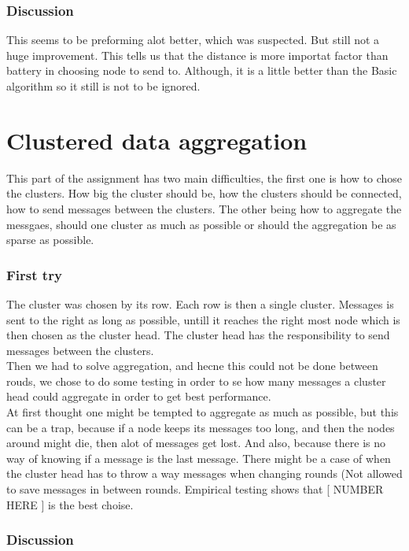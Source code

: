 \documentclass{article}
\begin{document}
    \section{Discussion}
      This seems to be preforming alot better, which was suspected. But still not a huge
      improvement. This tells us that the distance is more importat factor than battery
      in choosing node to send to. Although, it is a little better than the Basic algorithm
      so it still is not to be ignored.
\part{Clustered data aggregation}
  This part of the assignment has two main difficulties, the first one is 
  how to chose the clusters. How big the cluster should be, how the clusters
  should be connected, how to send messages between the clusters.
  The other being how to aggregate the messgaes, should one cluster as much
  as possible or should the aggregation be as sparse as possible.
  \section{First try}
    The cluster was chosen by its row. Each row is then a single cluster. Messages
    is sent to the right as long as possible, untill it reaches the right most
    node which is then chosen as the cluster head. The cluster head has the 
    responsibility to send messages between the clusters.\\
    Then we had to solve aggregation, and hecne this could not be done between
    rouds, we chose to do some testing in order to se how many messages a cluster
    head could aggregate in order to get best performance.\\
    At first thought one might be tempted to aggregate as much as possible, but
    this can be a trap, because if a node keeps its messages too long, and then 
    the nodes around might die, then alot of messages get lost. And also, because
    there is no way of knowing if a message is the last message. There might be 
    a case of when the cluster head has to throw a way messages when changing 
    rounds (Not allowed to save messages in between rounds. Empirical testing 
    shows that [ NUMBER HERE ] is the best choise.
    
    
  \section{Discussion}
    
  
\end{document}
